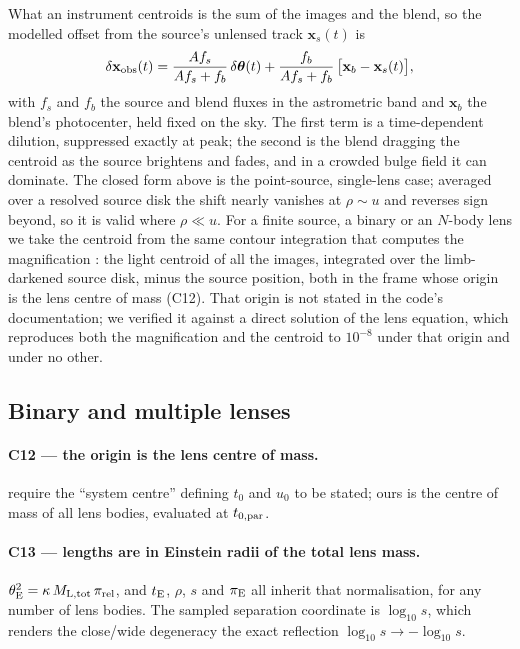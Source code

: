 What an instrument centroids is the sum of the images and the blend, so the
modelled offset from the source's unlensed track $\mathbf{x}_s(t)$ is
\begin{equation}
  \delta\mathbf{x}_{\rm obs}(t) = \frac{A f_s}{A f_s + f_b}\,
  \delta\boldsymbol{\theta}(t) + \frac{f_b}{A f_s + f_b}\,
  \bigl[\mathbf{x}_b - \mathbf{x}_s(t)\bigr],
\end{equation}
with $f_s$ and $f_b$ the source and blend fluxes in the astrometric band and
$\mathbf{x}_b$ the blend's photocenter, held fixed on the sky.  The first
term is a time-dependent dilution, suppressed exactly at peak; the second is
the blend dragging the centroid as the source brightens and fades, and in a
crowded bulge field it can dominate.  The closed form above is the
point-source, single-lens case; averaged over a resolved source disk the
shift nearly vanishes at $\rho \sim u$ and reverses sign beyond, so it is
valid where $\rho \ll u$.  For a finite source, a binary or an $N$-body
lens we take the centroid from the same contour integration that computes
the magnification \citep{Bozza:2018, Bozza:2025}: the light centroid of all
the images, integrated over the limb-darkened source disk, minus the source
position, both in the frame whose origin is the lens centre of mass (C12).
That origin is not stated in the code's documentation; we verified it
against a direct solution of the lens equation, which reproduces both the
magnification and the centroid to $10^{-8}$ under that origin and under no
other.

\subsection{Binary and multiple lenses}
\label{sec:conv:binary}

\paragraph{C12 --- the origin is the lens centre of mass.}
\citet{Skowron:2011} require the ``system centre'' defining $t_0$ and $u_0$
to be stated; ours is the centre of mass of all lens bodies, evaluated at
$t_{0,\rm par}$.

\paragraph{C13 --- lengths are in Einstein radii of the total lens mass.}
$\theta_{\rm E}^2 = \kappa\, M_{\rm L,tot}\, \pi_{\rm rel}$, and
$t_{\rm E}$, $\rho$, $s$ and $\pi_{\rm E}$ all inherit that normalisation,
for any number of lens bodies.  The sampled separation coordinate is
$\log_{10} s$, which renders the close/wide degeneracy the exact reflection
$\log_{10} s \rightarrow -\log_{10} s$.

